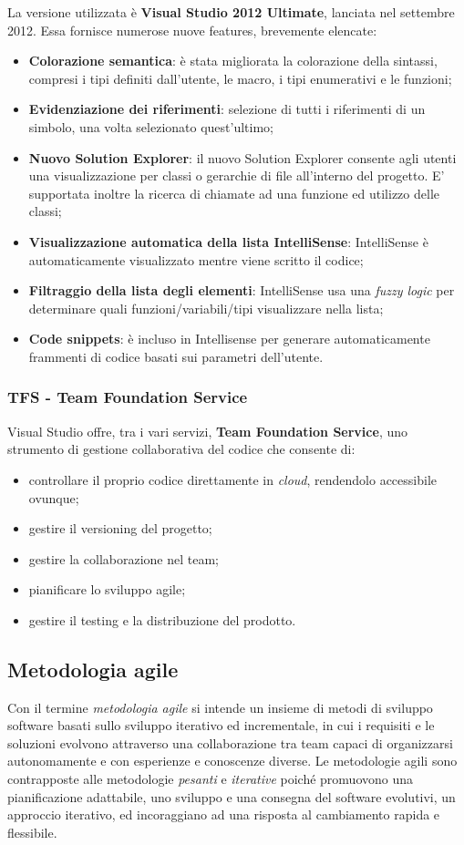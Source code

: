 La versione utilizzata è \textbf{Visual Studio 2012 Ultimate}, lanciata nel settembre 2012.
Essa fornisce numerose nuove features, brevemente elencate:
\begin{itemize}
\item \textbf{Colorazione semantica}: è stata migliorata la colorazione della sintassi, compresi i tipi definiti dall'utente, le macro, i tipi enumerativi e le funzioni;
\item \textbf{Evidenziazione dei riferimenti}: selezione di tutti i riferimenti di un simbolo, una volta selezionato quest'ultimo;
\item \textbf{Nuovo Solution Explorer}: il nuovo Solution Explorer consente agli utenti una visualizzazione per classi o gerarchie di file all'interno del progetto.
E' supportata inoltre la ricerca di chiamate ad una funzione ed utilizzo delle classi;
\item \textbf{Visualizzazione automatica della lista IntelliSense}: IntelliSense è automaticamente visualizzato mentre viene scritto il codice;
\item \textbf{Filtraggio della lista degli elementi}: IntelliSense usa una \textit{fuzzy logic} per determinare quali funzioni/variabili/tipi visualizzare nella lista;
\item \textbf{Code snippets}: è incluso in Intellisense per generare automaticamente frammenti di codice basati sui parametri dell'utente.
\end{itemize}

\subsubsection{TFS - Team Foundation Service}
Visual Studio offre, tra i vari servizi, \textbf{Team Foundation Service}, uno strumento di gestione collaborativa del codice che consente di:
\begin{itemize}
\item controllare il proprio codice direttamente in \textit{cloud}, rendendolo accessibile ovunque;
\item gestire il versioning del progetto;
\item gestire la collaborazione nel team;
\item pianificare lo sviluppo agile;
\item gestire il testing e la distribuzione del prodotto.
\end{itemize}

\subsection{Metodologia agile}
Con il termine \textit{metodologia agile} si intende un insieme di metodi di sviluppo software basati sullo sviluppo iterativo ed incrementale, in cui i requisiti e le soluzioni evolvono attraverso una collaborazione tra team capaci di organizzarsi autonomamente e con esperienze e conoscenze diverse.
Le metodologie agili sono contrapposte alle metodologie \textit{pesanti} e \textit{iterative} poiché promuovono una pianificazione adattabile, uno sviluppo e una consegna del software evolutivi, un approccio iterativo, ed incoraggiano ad una risposta al cambiamento rapida e flessibile.

